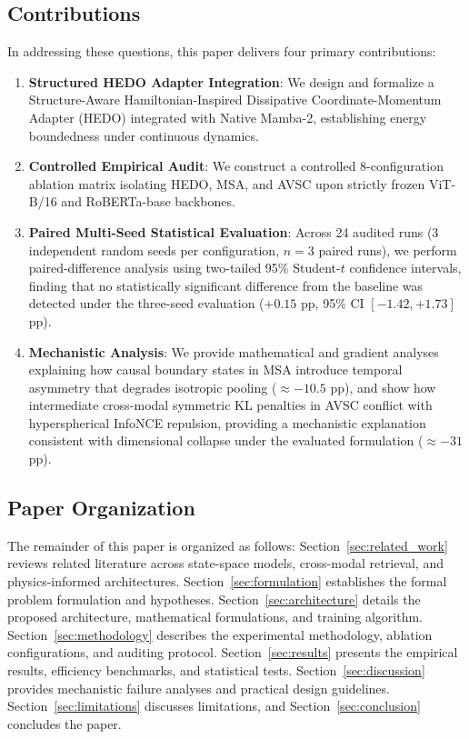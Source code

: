 \documentclass[10pt,journal,final]{IEEEtran}
\begin{document}
\subsection{Contributions}
In addressing these questions, this paper delivers four primary contributions:
\begin{enumerate}
    \item \textbf{Structured HEDO Adapter Integration}: We design and formalize a Structure-Aware Hamiltonian-Inspired Dissipative Coordinate-Momentum Adapter (HEDO) integrated with Native Mamba-2, establishing energy boundedness under continuous dynamics.
    \item \textbf{Controlled Empirical Audit}: We construct a controlled 8-configuration ablation matrix isolating HEDO, MSA, and AVSC upon strictly frozen ViT-B/16 and RoBERTa-base backbones.
    \item \textbf{Paired Multi-Seed Statistical Evaluation}: Across 24 audited runs (3 independent random seeds per configuration, $n=3$ paired runs), we perform paired-difference analysis using two-tailed 95\% Student-$t$ confidence intervals, finding that no statistically significant difference from the baseline was detected under the three-seed evaluation ($+0.15$ pp, 95\% CI $[-1.42, +1.73]$ pp).
    \item \textbf{Mechanistic Analysis}: We provide mathematical and gradient analyses explaining how causal boundary states in MSA introduce temporal asymmetry that degrades isotropic pooling ($\approx -10.5$ pp), and show how intermediate cross-modal symmetric KL penalties in AVSC conflict with hyperspherical InfoNCE repulsion, providing a mechanistic explanation consistent with dimensional collapse under the evaluated formulation ($\approx -31$ pp).
\end{enumerate}

\subsection{Paper Organization}
The remainder of this paper is organized as follows: Section~\ref{sec:related_work} reviews related literature across state-space models, cross-modal retrieval, and physics-informed architectures. Section~\ref{sec:formulation} establishes the formal problem formulation and hypotheses. Section~\ref{sec:architecture} details the proposed architecture, mathematical formulations, and training algorithm. Section~\ref{sec:methodology} describes the experimental methodology, ablation configurations, and auditing protocol. Section~\ref{sec:results} presents the empirical results, efficiency benchmarks, and statistical tests. Section~\ref{sec:discussion} provides mechanistic failure analyses and practical design guidelines. Section~\ref{sec:limitations} discusses limitations, and Section~\ref{sec:conclusion} concludes the paper.
\end{document}
